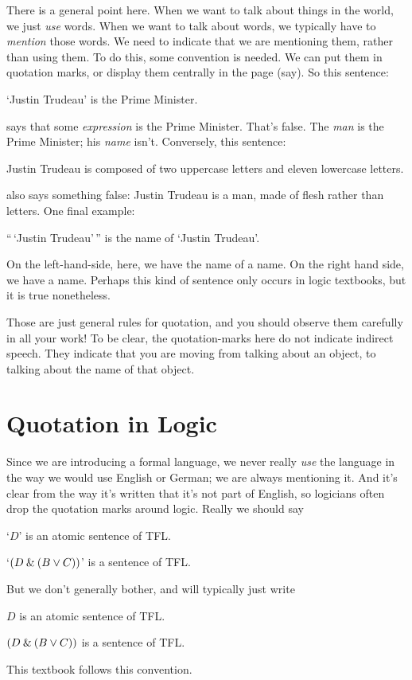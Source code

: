 There is a general point here. When we want to talk about things in the world, we just \emph{use} words. When we want to talk about words, we typically have to \emph{mention} those words. We need to indicate that we are mentioning them, rather than using them. To do this, some convention is needed. We can put them in quotation marks, or display them centrally in the page (say). So this sentence:
	\begin{ebullet}
		\item `Justin Trudeau' is the Prime Minister.
	\end{ebullet}
says that some \emph{expression} is the Prime Minister. That's false. The \emph{man} is the Prime Minister; his \emph{name} isn't. Conversely, this sentence:
	\begin{ebullet}
		\item Justin Trudeau is composed of two uppercase letters and eleven lowercase letters.
	\end{ebullet}
also says something false: Justin Trudeau is a man, made of flesh rather than letters. One final example:
	\begin{ebullet}
		\item ``\,`Justin Trudeau'\,'' is the name of `Justin Trudeau'.
	\end{ebullet}
On the left-hand-side, here, we have the name of a name. On the right hand side, we have a name. Perhaps this kind of sentence only occurs in logic textbooks, but it is true nonetheless.

Those are just general rules for quotation, and you should observe them carefully in all your work! To be clear, the quotation-marks here do not indicate indirect speech. They indicate that you are moving from talking about an object, to talking about the name of that object.

\section{Quotation in Logic}
Since we are introducing a formal language, we never really \emph{use} the language in the way we would use English or German; we are always mentioning it. And it's clear from the way it's written that it's not part of English, so logicians often drop the quotation marks around logic. Really we should say
	\begin{ebullet}
		\item `$D$' is an atomic sentence of TFL.
			\item `$(D\mathbin{\&}(B\vee C))$' is a sentence of TFL.
	\end{ebullet} But we don't generally bother, and will typically just write 	\begin{ebullet}
			\item $D$ is an atomic sentence of TFL.
				\item $(D\mathbin{\&}(B\vee C))$ is a sentence of TFL.
			\end{ebullet}
This textbook follows this convention.

